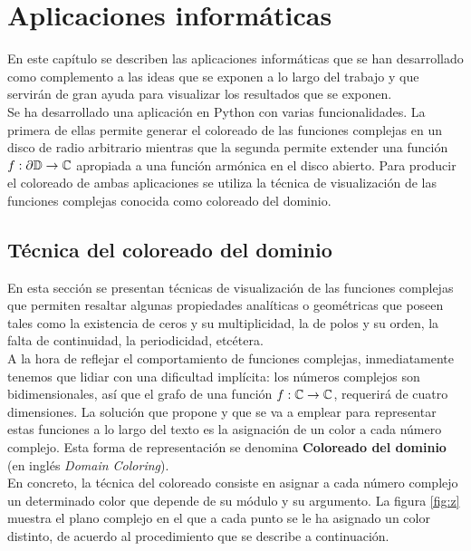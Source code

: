 \chapter{Aplicaciones informáticas}
\label{cap:aplicacion}

En este capítulo se describen las aplicaciones informáticas que se han desarrollado como complemento a las ideas que se exponen a lo largo del trabajo y que servirán de gran ayuda para visualizar los resultados que se exponen. \\

Se ha desarrollado una aplicación en Python con varias funcionalidades. La primera de ellas permite generar el coloreado de las funciones complejas en un disco de radio arbitrario mientras que la segunda permite extender una función $f: \partial \mathbb{D} \to \mathbb{C}$ apropiada a una función armónica en el disco abierto. Para producir el coloreado de ambas aplicaciones se utiliza la técnica de visualización de las funciones complejas conocida como coloreado del dominio. \\

\section{Técnica del coloreado del dominio}

En esta sección se presentan técnicas de visualización de las funciones complejas que permiten resaltar algunas propiedades analíticas o geométricas que poseen tales como la existencia de ceros y su multiplicidad, la de polos y su orden, la falta de continuidad, la periodicidad, etcétera. \\

A la hora de reflejar el comportamiento de funciones complejas, inmediatamente tenemos que lidiar con una dificultad implícita: los números complejos son bidimensionales, así que el grafo de una función $f : \mathbb{C} \to \mathbb{C}$, requerirá de cuatro dimensiones. La solución que propone \cite{Velleman2015} y que se va a emplear para representar estas funciones a lo largo del texto es la asignación de un color a cada número complejo. Esta forma de representación se denomina \textbf{Coloreado del dominio} (en inglés \textit{Domain Coloring}). \\

En concreto, la técnica del coloreado consiste en asignar a cada número complejo un determinado color que depende de su módulo y su argumento. La figura \ref{fig:z} muestra el plano complejo en el que a cada punto se le ha asignado un color distinto, de acuerdo al procedimiento que se describe a continuación. \\

